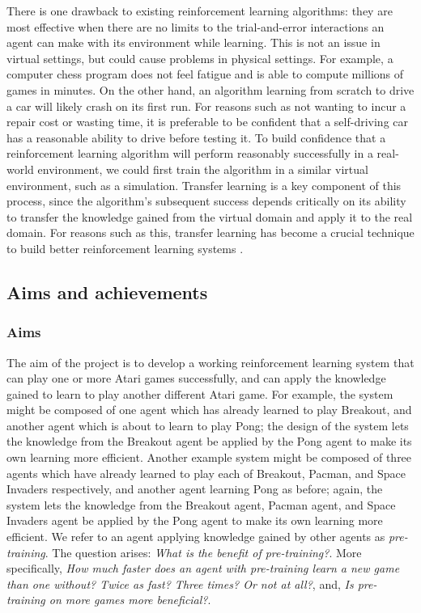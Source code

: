 \documentclass[12pt,a4paper]{article}
\begin{document}
There is one drawback to existing reinforcement learning algorithms: they are most effective when there are no limits to the trial-and-error interactions an agent can make with its environment while learning. This is not an issue in virtual settings, but could cause problems in physical settings. For example, a computer chess program does not feel fatigue and is able to compute millions of games in minutes. On the other hand, an algorithm learning from scratch to drive a car will likely crash on its first run. For reasons such as not wanting to incur a repair cost or wasting time, it is preferable to be confident that a self-driving car has a reasonable ability to drive before testing it. To build confidence that a reinforcement learning algorithm will perform reasonably successfully in a real-world environment, we could first train the algorithm in a similar virtual environment, such as a simulation. Transfer learning is a key component of this process, since the algorithm's subsequent success depends critically on its ability to transfer the knowledge gained from the virtual domain and apply it to the real domain. For reasons such as this, transfer learning has become a crucial technique to build better reinforcement learning systems \cite{}. 

\subsection{Aims and achievements}
\subsubsection{Aims}
The aim of the project is to develop a working reinforcement learning system that can play one or more Atari games successfully, and can apply the knowledge gained to learn to play another different Atari game. For example, the system might be composed of one agent which has already learned to play Breakout, and another agent which is about to learn to play Pong; the design of the system lets the knowledge from the Breakout agent be applied by the Pong agent to make its own learning more efficient. Another example system might be composed of three agents which have already learned to play each of Breakout, Pacman, and Space Invaders respectively, and another agent learning Pong as before; again, the system lets the knowledge from the Breakout agent, Pacman agent, and Space Invaders agent be applied by the Pong agent to make its own learning more efficient. We refer to an agent applying knowledge gained by other agents as \textit{pre-training}. The question arises: \textit{What is the benefit of pre-training?}. More specifically, \textit{How much faster does an agent with pre-training learn a new game than one without? Twice as fast? Three times? Or not at all?}, and, \textit{Is pre-training on more games more beneficial?}. 
\end{document}
